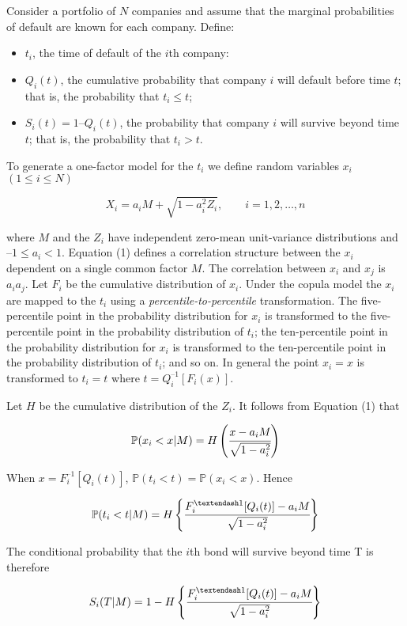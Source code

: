 \documentclass[11pt]{article}
\providecommand{\tightlist}{%
      \setlength{\itemsep}{0pt}\setlength{\parskip}{0pt}}
\def\lt{<}
\begin{document}
Consider a portfolio of \(N\) companies and assume that the marginal
probabilities of default are known for each company. Define:

\begin{itemize}
\tightlist
\item
  \(t_i\), the time of default of the \(i\)th company:
\item
  \(Q_i(t)\), the cumulative probability that company \(i\) will default
  before time \(t\); that is, the probability that \(t_i \le t\);
\item
  \(S_i(t) = 1 – Q_i(t)\), the probability that company \(i\) will
  survive beyond time \(t\); that is, the probability that \(t_i > t\).
\end{itemize}

To generate a one-factor model for the \(t_i\) we define random
variables \(x_i\) \((1\le i \le N)\)

\[X_i = a_i M + \sqrt{1-a_i^2 Z_i},\qquad i = 1, 2,\ldots, n\]

where \(M\) and the \(Z_i\) have independent zero-mean unit-variance
distributions and \(–1 \le a_i \lt 1\). Equation (1) defines a
correlation structure between the \(x_i\) dependent on a single common
factor \(M\). The correlation between \(x_i\) and \(x_j\) is
\(a_i a_j\). Let \(F_i\) be the cumulative distribution of \(x_i\).
Under the copula model the \(x_i\) are mapped to the \(t_i\) using a
\emph{percentile-to-percentile} transformation. The five-percentile
point in the probability distribution for \(x_i\) is transformed to the
five-percentile point in the probability distribution of \(t_i\); the
ten-percentile point in the probability distribution for \(x_i\) is
transformed to the ten-percentile point in the probability distribution
of \(t_i\); and so on. In general the point \(x_i = x\) is transformed
to \(t_i = t\) where \(t = Q_i^{–1}[F_i(x)]\).

Let \(H\) be the cumulative distribution of the \(Z_i\). It follows from
Equation (1) that

\[\mathbb{P}(x_i < x|M) = H\left(\cfrac{x-a_i M}{\sqrt{1-a_i^2}}\right)\]

When \(x = F_i^{–1}[Q_i(t)]\),
\(\mathbb{P}(t_i < t) = \mathbb{P}(x_i < x)\). Hence

\[\mathbb{P}(t_i < t|M) = H\left\{\cfrac{F_i^{–1}[Q_i(t)]-a_i M}{\sqrt{1-a_i^2}}\right\}\]

The conditional probability that the \(i\)th bond will survive beyond
time T is therefore

\[S_i(T|M) = 1 - H\left\{\cfrac{F_i^{–1}[Q_i(t)]-a_i M}{\sqrt{1-a_i^2}}\right\}\]
\end{document}
